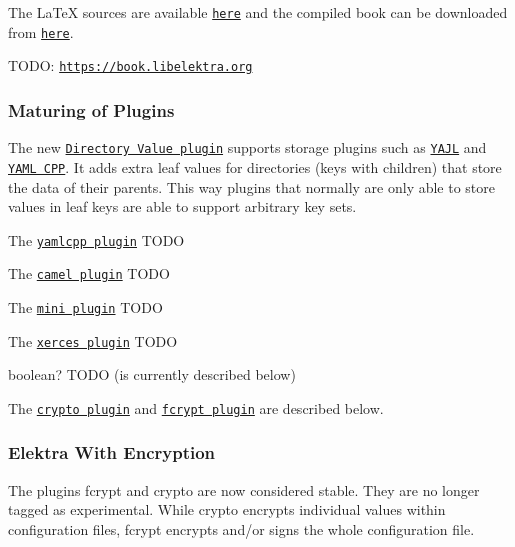 The La\+TeX sources are available \href{https://github.com/ElektraInitiative/book}{\tt here} and the compiled book can be downloaded from \href{https://github.com/ElektraInitiative/book/raw/master/book/book.pdf}{\tt here}.

T\+O\+DO\+: \href{https://book.libelektra.org}{\tt https\+://book.\+libelektra.\+org}

\subsubsection*{Maturing of Plugins}


\begin{DoxyItemize}
\item The new \href{https://www.libelektra.org/plugins/directoryvalue}{\tt Directory Value plugin} supports storage plugins such as \href{https://www.libelektra.org/plugins/yajl}{\tt Y\+A\+JL} and \href{https://www.libelektra.org/plugins/yamlcpp}{\tt Y\+A\+ML C\+PP}. It adds extra leaf values for directories (keys with children) that store the data of their parents. This way plugins that normally are only able to store values in leaf keys are able to support arbitrary key sets.
\item The \href{https://www.libelektra.org/plugins/yamlcpp}{\tt yamlcpp plugin} T\+O\+DO
\item The \href{https://www.libelektra.org/plugins/camel}{\tt camel plugin} T\+O\+DO
\item The \href{https://www.libelektra.org/plugins/mini}{\tt mini plugin} T\+O\+DO
\item The \href{https://www.libelektra.org/plugins/xerces}{\tt xerces plugin} T\+O\+DO
\item boolean? T\+O\+DO (is currently described below)
\item The \href{https://www.libelektra.org/plugins/crypto}{\tt crypto plugin} and \href{https://www.libelektra.org/plugins/fcrypt}{\tt fcrypt plugin} are described below.
\end{DoxyItemize}

\subsubsection*{Elektra With Encryption}

The plugins {\ttfamily fcrypt} and {\ttfamily crypto} are now considered stable. They are no longer tagged as {\ttfamily experimental}. While {\ttfamily crypto} encrypts individual values within configuration files, {\ttfamily fcrypt} encrypts and/or signs the whole configuration file.

